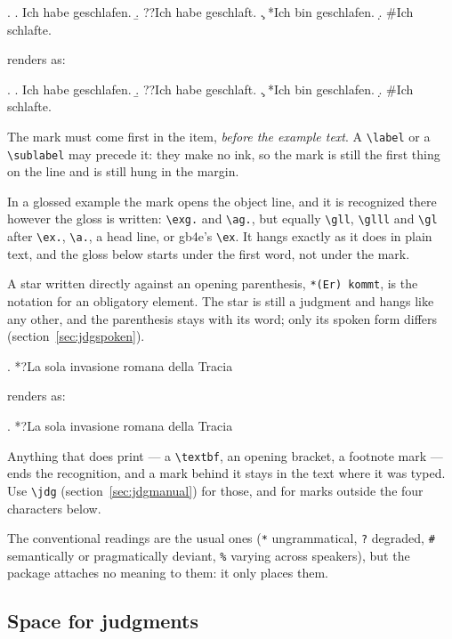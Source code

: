 \documentclass[11pt,a4paper]{article}
\newcommand{\cs}[1]{\texttt{\textbackslash #1}}
\newcommand{\pkg}[2][]{\textsf{#2}}
\newcommand{\rendered}{\par\medskip\noindent\textcolor{gray!70}{\small renders as:}\par\nobreak\smallskip}
\newcommand{\afterex}{\par\addvspace{\medskipamount}}
\begin{document}
\begin{code}
\ex.
\a. Ich habe geschlafen.
\b. ??Ich habe geschlaft.
\c. *Ich bin geschlafen.
\d. \#Ich schlafte.
\end{code}

\rendered
\ex.
\a. Ich habe geschlafen.
\b. ??Ich habe geschlaft.
\c. *Ich bin geschlafen.
\d. \#Ich schlafte.

\afterex
The mark must come first in the item, \emph{before the example text}. A
\cs{label} or a \cs{sublabel} may precede it: they make no ink, so the mark
is still the first thing on the line and is still hung in the margin.

In a glossed example the mark opens the object line, and it is recognized
there however the gloss is written: \cs{exg.} and \cs{ag.}, but equally
\cs{gll}, \cs{glll} and \cs{gl} after \cs{ex.}, \cs{a.}, a head line, or
\pkg{gb4e}'s \cs{ex}. It hangs exactly as it does in plain text, and the
gloss below starts under the first word, not under the mark.

A star written directly against an opening parenthesis, \verb|*(Er) kommt|,
is the notation for an obligatory element. The star is still a judgment and
hangs like any other, and the parenthesis stays with its word; only its
spoken form differs (section~\ref{sec:jdgspoken}).

\begin{code}
\ex. \label{ex:invasione}*?La sola invasione romana della Tracia
\end{code}

\rendered
\ex. \label{ex:invasione}*?La sola invasione romana della Tracia

\afterex
Anything that does print --- a \cs{textbf}, an opening bracket, a footnote
mark --- ends the recognition, and a mark behind it stays in the text where
it was typed. Use \cs{jdg} (section~\ref{sec:jdgmanual}) for those, and for
marks outside the four characters below.

The conventional readings are the usual ones (\texttt{*}
ungrammatical, \texttt{?} degraded, \texttt{\#} semantically or
pragmatically deviant, \texttt{\%} varying across speakers), but the
package attaches no meaning to them: it only places them.

\subsection{Space for judgments}\label{sec:jdgspace}
\end{document}
